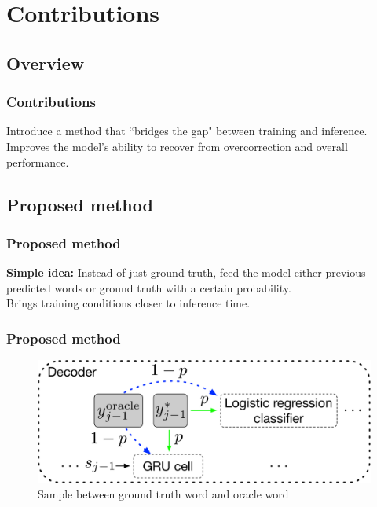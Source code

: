 \documentclass{beamer}
\begin{document}

\section{Contributions}

\subsection{Overview}

\begin{frame}
    \frametitle{Contributions}
    Introduce a method that ``bridges the gap" between training and inference.\\
    \bigskip
    Improves the model's ability to recover from overcorrection and overall performance.
\end{frame}


\subsection{Proposed method}

\begin{frame}
    \frametitle{Proposed method}
    \textbf{Simple idea:} Instead of just ground truth, feed the model either previous predicted words or ground truth with a certain probability.\\
    \bigskip
    Brings training conditions closer to inference time.
\end{frame}


\begin{frame}
    \frametitle{Proposed method}
    \begin{figure}
        \centering
        \includegraphics[width=\textwidth]{fig/decoder-p.pdf}
        \caption{Sample between ground truth word and oracle word}
    \end{figure} 
\end{frame}
\end{document}
